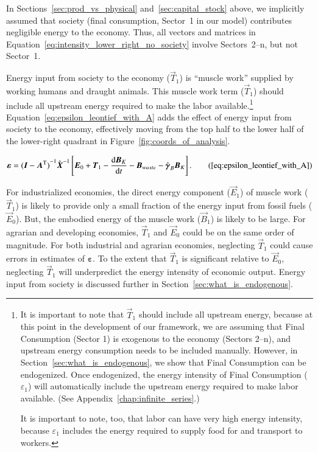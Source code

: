 In Sections~\ref{sec:prod_vs_physical}
and~\ref{sec:capital_stock} above,
we implicitly assumed that society 
(final consumption, Sector~1 in our model)
contributes negligible energy to the economy.
Thus, all vectors and matrices in Equation~\ref{eq:intensity_lower_right_no_society}
involve Sectors~2--n, but not Sector~1.

Energy input from society to the economy ($\vec{T}_{1}$)
is ``muscle work'' supplied by working humans 
and draught animals.\cite{Ayres:2003ec,Ayres:2010ug,Warr:2012cg} 
This muscle work term ($\vec{T}_{1}$) should include
all upstream energy required to make the labor available.\footnote{It is important
	to note that $\vec{T}_{1}$ should include all upstream energy,
	because at this point in the development of our framework,
	we are assuming that Final Consumption (Sector 1) is exogenous to the economy 
	(Sectors 2--n), 
	and upstream energy consumption needs to be included manually.
	However, in Section~\ref{sec:what_is_endogenous}, we show that Final Consumption
	can be endogenized.
	Once endogenized, the energy intensity of Final Consumption ($\varepsilon_{1}$) 
	will automatically include the upstream energy required to make labor available.
	(See Appendix~\ref{chap:infinite_series}.)

	It is important to note, too, that labor can have very high energy intensity, 
	because $\varepsilon_{1}$ includes the energy required to supply food 
	for and transport to workers.} 
Equation~\ref{eq:epsilon_leontief_with_A} 
adds the effect of energy input from society to the economy,
effectively moving from the top half to the lower half of the lower-right quadrant
in Figure~\ref{fig:coords_of_analysis}.

\begin{equation}
	\boldsymbol{\varepsilon} 
	= {(\vec{I} - \vec{A}^{\mathrm{T}})}^{-1}\hat{\vec{X}}^{-1}
		\left[\vec{E}_{0} 
				+ \vec{T}_{1} 
				- \frac{\mathrm{d}\vec{B}_{K}}{\mathrm{d}t} 
				- \vec{B}_{waste}
				- \hat{\boldsymbol{\gamma}}_{B}\vec{B}_{K}
		\right].\tag{\ref{eq:epsilon_leontief_with_A}}
\end{equation}

For industrialized economies, the direct energy component ($\vec{E}_{1}$) 
of muscle work ($\vec{T}_{1}$)
is likely to provide only a small fraction
of the energy input from fossil fuels ($\vec{E}_{0}$).
But, the embodied energy of the muscle work ($\vec{B}_{1}$) is likely to be large.
For agrarian 
and developing economies, 
$\vec{T}_{1}$ and $\vec{E}_{0}$ 
could be on the same order of magnitude.
For both industrial and agrarian economies,
neglecting $\vec{T}_{1}$ could cause errors
in estimates of $\boldsymbol{\varepsilon}$.
To the extent that $\vec{T}_{1}$ 
is significant relative to $\vec{E}_{0}$,
neglecting $\vec{T}_{1}$
will underpredict the energy intensity of economic output.
Energy input from society is discussed further 
in Section~\ref{sec:what_is_endogenous}.

